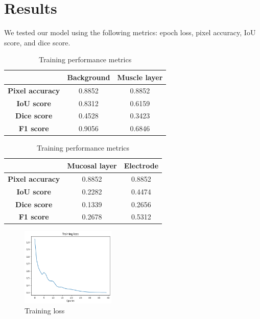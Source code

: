 \section{Results}
\label{sec:results}

We tested our model using the following metrics: epoch loss, pixel accuracy, IoU score, and dice score.

\begin{table}[htbp]
    \centering
    \caption{Training performance metrics}
    \label{tab:example}

    \begin{tabular}{|c|c|c|}
        \hline
        \textbf{} & \textbf{Background} & \textbf{Muscle layer} \\
        \hline
        \textbf{Pixel accuracy} & 0.8852 & 0.8852 \\
        \textbf{IoU score} & 0.8312 & 0.6159 \\
        \textbf{Dice score} & 0.4528 & 0.3423 \\
        \textbf{F1 score} & 0.9056 & 0.6846 \\
        \hline
    \end{tabular}

    \begin{tabular}{|c|c|c|}
        \hline
        \textbf{} & \textbf{Mucosal layer} & \textbf{Electrode} \\
        \hline
        \textbf{Pixel accuracy} & 0.8852 & 0.8852 \\
        \textbf{IoU score} & 0.2282 & 0.4474 \\
        \textbf{Dice score} & 0.1339 & 0.2656 \\
        \textbf{F1 score} & 0.2678 & 0.5312 \\
        \hline
    \end{tabular}

\end{table}

\begin{figure}[htp!]
    \centering
    \includegraphics[width=0.4\textwidth]{Images/loss.png}
    \caption{Training loss}
    \label{fig:loss}
\end{figure}

